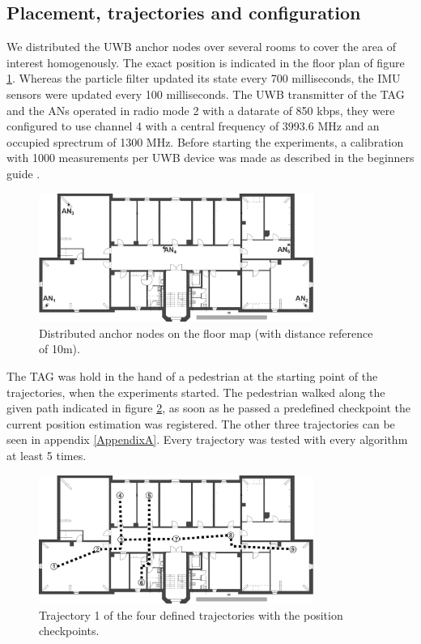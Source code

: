 \subsection{Placement, trajectories and configuration}
We distributed the UWB anchor nodes over several rooms to cover the area of interest homogenously. The exact position is indicated in the floor plan of figure \ref{fig:anchor_position}. Whereas the particle filter updated its state every 700 milliseconds, the IMU sensors were updated every 100 milliseconds. The UWB transmitter of the TAG and the ANs operated in radio mode 2 with a datarate of 850 kbps, they were configured to use channel 4 with a central frequency of 3993.6 MHz and an occupied sprectrum of 1300 MHz. Before starting the experiments, a calibration with 1000 measurements per UWB device was made as described in the beginners guide \cite{Beginnersguide}.

\begin{figure}[th]
\centering
\includegraphics[width=0.8\textwidth]{Figures/anchor_position}
\decoRule
\caption[Anchor node positions]{Distributed anchor nodes on the floor map (with distance reference of 10m).}
\label{fig:anchor_position}
\end{figure}

The TAG was hold in the hand of a pedestrian at the starting point of the trajectories, when the experiments started. The pedestrian walked along the given path indicated in figure \ref{fig:trajectory1}, as soon as he passed a predefined checkpoint the current position estimation was registered. The other three trajectories can be seen in appendix \ref{AppendixA}. Every trajectory was tested with every algorithm at least 5 times.

\begin{figure}[th]
\centering
\includegraphics[width=0.8\textwidth]{Figures/trajectory1}
\decoRule
\caption[Trajectory 1]{Trajectory 1 of the four defined trajectories with the position checkpoints.}
\label{fig:trajectory1}
\end{figure}

